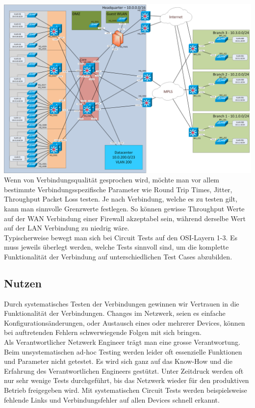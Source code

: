 \documentclass[a4,12pt]{scrartcl}
\begin{document}
\includegraphics[width=1\textwidth]{figures/Netzwerk_logisch.png}\\

\noindent Wenn von Verbindungsqualität gesprochen wird, möchte man vor allem bestimmte Verbindungsspezifische Parameter wie Round Trip Times, Jitter, Throughput Packet Loss testen. Je nach Verbindung, welche es zu testen gilt, kann man sinnvolle Grenzwerte festlegen. So können gewisse Throughput Werte auf der WAN Verbindung einer Firewall akzeptabel sein, während derselbe Wert auf der LAN Verbindung zu niedrig wäre.\\

\noindent Typischerweise bewegt man sich bei Circuit Tests auf den OSI-Layern 1-3. Es muss jeweils überlegt werden, welche Tests sinnvoll sind, um die komplette Funktionalität der Verbindung auf unterschiedlichen Test Cases abzubilden.   
\subsection{Nutzen}
Durch systematisches Testen der Verbindungen gewinnen wir Vertrauen in die Funktionalität der Verbindungen. Changes im Netzwerk, seien es einfache Konfigurationsänderungen, oder Austausch eines oder mehrerer Devices, können bei auftretenden Fehlern schwerwiegende Folgen mit sich bringen.\\

\noindent Als Verantwortlicher Netzwerk Engineer trägt man eine grosse Verantwortung. Beim unsystematischen ad-hoc Testing werden leider oft essenzielle Funktionen und Parameter nicht getestet. Es wird sich ganz auf das Know-How und die Erfahrung des Verantwortlichen Engineers gestützt. Unter Zeitdruck werden oft nur sehr wenige Tests durchgeführt, bis das Netzwerk wieder für den produktiven Betrieb freigegeben wird. Mit systematischen Circuit Tests werden beispielsweise fehlende Links und Verbindungsfehler auf allen Devices schnell erkannt. 
\end{document}
